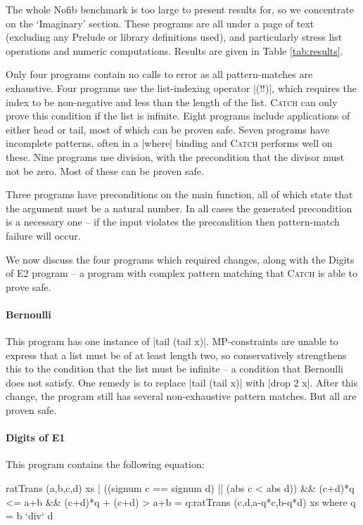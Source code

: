\documentclass[preprint]{sigplanconf}
\newcommand{\C}[1]{\textsf{#1}}
\newcommand{\catch}{\textsc{Catch}}
\begin{document}
The whole Nofib benchmark \citep{nofib} is too large to present results for, so we concentrate on the `Imaginary' section. These programs are all under a page of text (excluding any Prelude or library definitions used), and particularly stress list operations and numeric computations.
Results are given in Table \ref{tab:results}.

Only four programs contain no calls to \C{error} as all pattern-matches are exhaustive. Four programs use the list-indexing operator |(!!)|, which requires the index to be non-negative and less than the length of the list. \catch{} can only prove this condition if the list is infinite. Eight programs include applications of either \C{head} or \C{tail}, most of which can be proven safe. Seven programs have incomplete patterns, often in a |where| binding and \catch{} performs well on these. Nine programs use division, with the precondition that the divisor must not be zero. Most of these can be proven safe.

Three programs have preconditions on the \C{main} function, all of which state that the argument must be a natural number. In all cases the generated precondition is a necessary one -- if the input violates the precondition then pattern-match failure will occur.

We now discuss the four programs which required changes, along with the Digits of E2 program -- a program with complex pattern matching that \catch{} is able to prove safe.

\paragraph{Bernoulli}

This program has one instance of |tail (tail x)|. MP-constraints are unable to express that a list must be of at least length two, so conservatively strengthens this to the condition that the list must be infinite -- a condition that Bernoulli does not satisfy. One remedy is to replace |tail (tail x)| with |drop 2 x|. After this change, the program still has several non-exhaustive pattern matches. But all are proven safe.


\paragraph{Digits of E1}

This program contains the following equation:

\begin{code}
ratTrans (a,b,c,d) xs |
  ((signum c == signum d) || (abs c < abs d)) &&
  (c+d)*q <= a+b && (c+d)*q + (c+d) > a+b
     = q:ratTrans (c,d,a-q*c,b-q*d) xs
  where q = b `div` d
\end{code}
\end{document}

